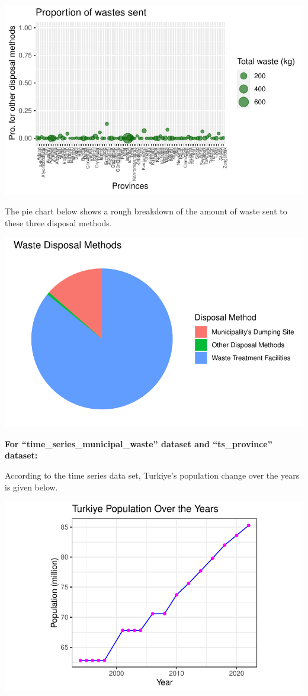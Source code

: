 \documentclass[
  11pt,
  a4paper,
  DIV=11,
  numbers=noendperiod]{scrartcl}
\begin{document}
\includegraphics{project_files/figure-pdf/unnamed-chunk-19-1.pdf}

The pie chart below shows a rough breakdown of the amount of waste sent
to these three disposal methods.

\includegraphics{project_files/figure-pdf/unnamed-chunk-20-1.pdf}

{\textbf{For ``time\_series\_municipal\_waste'' dataset and
``ts\_province'' dataset:}}

According to the time series data set, Turkiye's population change over
the years is given below.

\includegraphics{project_files/figure-pdf/unnamed-chunk-21-1.pdf}
\end{document}
